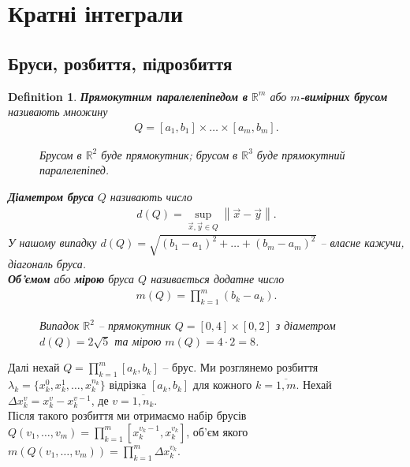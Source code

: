 \documentclass[a4paper, 10pt]{article}
\theoremstyle{theoremdd}
\theoremstyle{theoremdd}
\newtheorem{definition}[theorem]{Definition}
\theoremstyle{theoremdd}
\theoremstyle{theoremdd}
\theoremstyle{theoremdd}
\theoremstyle{theoremdd}
\theoremstyle{theoremdd}
\theoremstyle{theoremdd}
\newcommand\Norm[1]{\left\lVert#1\right\rVert}
\begin{document}
\section{Кратні інтеграли}
\subsection{Бруси, розбиття, підрозбиття}
\begin{definition}
\textbf{Прямокутним паралелепіпедом в} $\mathbb{R}^m$ або \textbf{$m$-вимірних брусом} називають множину
\begin{align*}
Q = [a_1,b_1] \times \dots \times [a_m,b_m].
\end{align*}
\begin{figure}[H]
\centering
{}
\qquad
{}
\caption*{Брусом в $\mathbb{R}^2$ буде прямокутник; брусом в $\mathbb{R}^3$ буде прямокутний паралелепіпед.}
\end{figure}
\textbf{Діаметром бруса} $Q$ називають число
\begin{align*}
d(Q) = \sup_{\vec{x},\vec{y} \in Q} \Norm{\vec{x}-\vec{y}}.
\end{align*}
У нашому випадку $d(Q) = \sqrt{(b_1-a_1)^2 + \dots + (b_m-a_m)^2}$ -- власне кажучи, діагональ бруса.\\
\textbf{Об'ємом} або \textbf{мірою} бруса $Q$ називається додатне число
\begin{align*}
m(Q) = \prod_{k=1}^m (b_k-a_k).
\end{align*}
\begin{figure}[H]
\centering
{}
\caption*{Випадок $\mathbb{R}^2$ -- прямокутник $Q = [0,4] \times [0,2]$ з діаметром $d(Q) = 2 \sqrt{5}$ та мірою $m(Q) = 4 \cdot 2 = 8$.}
\end{figure}
\end{definition}
\noindent
Далі нехай $Q = \displaystyle\prod_{k=1}^m [a_k,b_k]$ -- брус. Ми розглянемо розбиття $\lambda_k = \{x_k^0, x_k^1,\dots,x_k^{n_k} \}$ відрізка $[a_k,b_k]$ для кожного $k = \overline{1,m}$. Нехай $\Delta x_k^v = x_k^{v} - x_k^{v-1}$, де $v = \overline{1,n_k}$.\\
Після такого розбиття ми отримаємо набір брусів $Q(v_1,\dots,v_m) = \displaystyle\prod_{k=1}^m [x_{k}^{v_k-1}, x_k^{v_k}]$, об'єм якого $m(Q(v_1,\dots,v_m)) = \displaystyle\prod_{k=1}^m \Delta x_k^{v_k}$.
\end{document}
